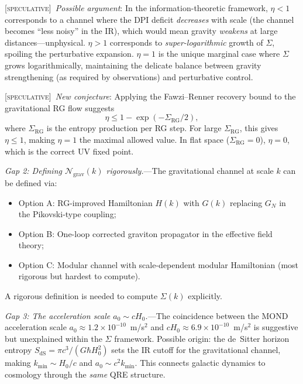 \documentclass[prl,twocolumn,superscriptaddress,longbibliography,floatfix]{revtex4-2}
\newcommand{\chan}{\mathcal{N}}
\newcommand{\spec}{\textsc{[speculative]}}
\begin{document}
\spec\ \emph{Possible argument}: In the information-theoretic
framework, $\eta < 1$ corresponds to a channel where the DPI
deficit \emph{decreases} with scale (the channel becomes ``less
noisy'' in the IR), which would mean gravity \emph{weakens} at
large distances---unphysical. $\eta > 1$ corresponds to
\emph{super-logarithmic} growth of $\Sigma$, spoiling the
perturbative expansion. $\eta = 1$ is the unique marginal
case where $\Sigma$ grows logarithmically, maintaining the
delicate balance between gravity strengthening (as required by
observations) and perturbative control.

\spec\ \emph{New conjecture}: Applying the Fawzi--Renner
recovery bound to the gravitational RG flow suggests
\begin{equation}
\eta \leq 1 - \exp(-\Sigma_{\mathrm{RG}}/2),
\label{eq:eta_bound}
\end{equation}
where $\Sigma_{\mathrm{RG}}$ is the entropy production per RG
step. For large $\Sigma_{\mathrm{RG}}$, this gives $\eta \leq 1$,
making $\eta = 1$ the maximal allowed value. In flat space
($\Sigma_{\mathrm{RG}} = 0$), $\eta = 0$, which is the correct
UV fixed point.

\emph{Gap 2: Defining $\chan_{\mathrm{grav}}(k)$ rigorously.}---The
gravitational channel at scale $k$ can be defined via:
\begin{itemize}
\item Option A: RG-improved Hamiltonian $H(k)$ with $G(k)$
  replacing $G_N$ in the Pikovski-type coupling;
\item Option B: One-loop corrected graviton propagator in the
  effective field theory;
\item Option C: Modular channel with scale-dependent modular
  Hamiltonian (most rigorous but hardest to compute).
\end{itemize}
A rigorous definition is needed to compute $\Sigma(k)$ explicitly.

\emph{Gap 3: The acceleration scale $a_0 \sim cH_0$.}---The
coincidence between the MOND acceleration scale
$a_0 \approx 1.2 \times 10^{-10}$~m/s$^2$ and $cH_0 \approx
6.9 \times 10^{-10}$~m/s$^2$ is suggestive but unexplained
within the $\Sigma$ framework. Possible origin: the de~Sitter
horizon entropy $S_{\mathrm{dS}} = \pi c^3/(G\hbar H_0^2)$ sets
the IR cutoff for the gravitational channel, making
$k_{\mathrm{min}} \sim H_0/c$ and $a_0 \sim c^2 k_{\mathrm{min}}$.
This connects galactic dynamics to cosmology through the
\emph{same} QRE structure.

\end{document}

